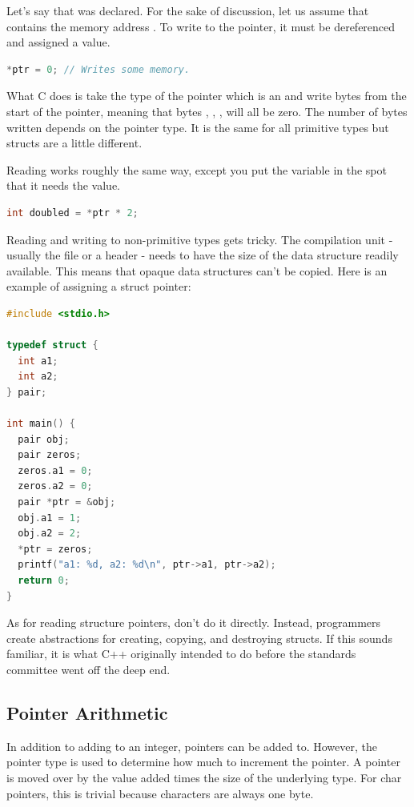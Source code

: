 Let's say that  was declared.
For the sake of discussion, let us assume that  contains the memory address .
To write to the pointer, it must be dereferenced and assigned a value.

\begin{lstlisting}[language=C]
*ptr = 0; // Writes some memory.
\end{lstlisting}

What C does is take the type of the pointer which is an  and write  bytes from the start of the pointer, meaning that bytes , , ,  will all be zero.
The number of bytes written depends on the pointer type.
It is the same for all primitive types but structs are a little different.

Reading works roughly the same way, except you put the variable in the spot that it needs the value.

\begin{lstlisting}[language=C]
int doubled = *ptr * 2;
\end{lstlisting}

Reading and writing to non-primitive types gets tricky.
The compilation unit - usually the file or a header - needs to have the size of the data structure readily available.
This means that opaque data structures can't be copied.
Here is an example of assigning a struct pointer:

\begin{lstlisting}[language=C]
#include <stdio.h>

typedef struct {
  int a1;
  int a2;
} pair;

int main() {
  pair obj;
  pair zeros;
  zeros.a1 = 0;
  zeros.a2 = 0;
  pair *ptr = &obj;
  obj.a1 = 1;
  obj.a2 = 2;
  *ptr = zeros;
  printf("a1: %d, a2: %d\n", ptr->a1, ptr->a2);
  return 0;
}
\end{lstlisting}

As for reading structure pointers, don't do it directly.
Instead, programmers create abstractions for creating, copying, and destroying structs.
If this sounds familiar, it is what C++ originally intended to do before the standards committee went off the deep end.

\subsection{Pointer Arithmetic}

In addition to adding to an integer, pointers can be added to.
However, the pointer type is used to determine how much to increment the pointer.
A pointer is moved over by the value added times the size of the underlying type.
For char pointers, this is trivial because characters are always one byte.

